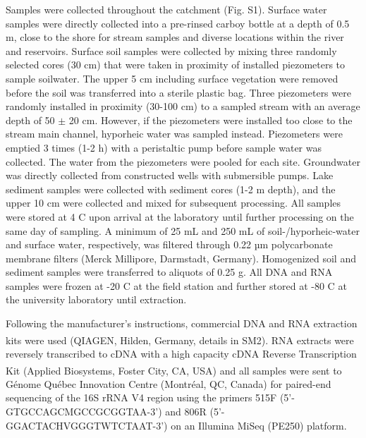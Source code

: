 \documentclass[12pt,a4paper]{article} %
\begin{document}
Samples were collected throughout the catchment (Fig. S1). Surface water samples were directly collected into a pre-rinsed carboy bottle at a depth of 0.5 m, close to the shore for stream samples and diverse locations within the river and reservoirs. Surface soil samples were collected by mixing three randomly selected cores (30 cm) that were taken in proximity of installed piezometers to sample soilwater. The upper 5 cm including surface vegetation were removed before the soil was transferred into a sterile plastic bag. Three piezometers were randomly installed in proximity (30-100 cm) to a sampled stream with an average depth of 50 $\pm$ 20 cm. However, if the piezometers were installed too close to the stream main channel, hyporheic water was sampled instead. Piezometers were emptied 3 times (1-2 h) with a peristaltic pump before sample water was collected. The water from the piezometers were pooled for each site. Groundwater was directly collected from constructed wells with submersible pumps. Lake sediment samples were collected with sediment cores (1-2 m depth), and the upper 10 cm were collected and mixed for subsequent processing. All samples were stored at 4 \textdegree{}C upon arrival at the laboratory until further processing on the same day of sampling. A minimum of 25 mL and 250 mL of soil-/hyporheic-water and surface water, respectively, was filtered through 0.22 µm polycarbonate membrane filters (Merck Millipore, Darmstadt, Germany). Homogenized soil and sediment samples were transferred to aliquots of 0.25 g. All DNA and RNA samples were frozen at -20 \textdegree{}C at the field station and further stored at -80 \textdegree{}C at the university laboratory until extraction.

Following the manufacturer's instructions, commercial DNA and RNA extraction kits were used (QIAGEN\textsuperscript{\textregistered}, Hilden, Germany, details in SM2). RNA extracts were reversely transcribed to cDNA with a high capacity cDNA Reverse Transcription Kit (Applied Biosystems\textsuperscript{\texttrademark}, Foster City, CA, USA) and all samples were sent to G\'{e}nome Qu\'{e}bec Innovation Centre (Montr\'{e}al, QC, Canada) for paired-end sequencing of the 16S rRNA V4 region using the primers 515F (5'-GTGCCAGCMGCCGCGGTAA-3') and 806R (5'-GGACTACHVGGGTWTCTAAT-3') on an Illumina MiSeq (PE250) platform.
\end{document}
